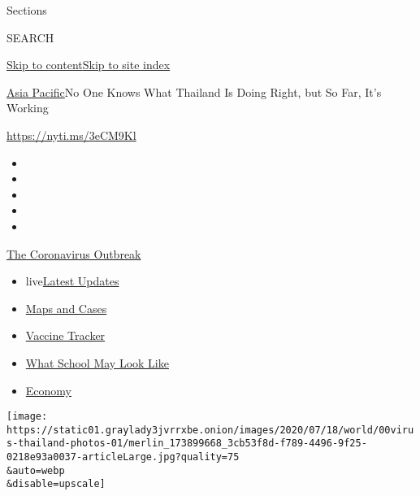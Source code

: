 Sections

SEARCH

\protect\hyperlink{site-content}{Skip to
content}\protect\hyperlink{site-index}{Skip to site index}

\href{/section/world/asia}{Asia Pacific}\textbar{}No One Knows What
Thailand Is Doing Right, but So Far, It's Working

\url{https://nyti.ms/3eCM9Kl}

\begin{itemize}
\item
\item
\item
\item
\item
\end{itemize}

\href{https://www.nytimes3xbfgragh.onion/news-event/coronavirus?action=click\&pgtype=Article\&state=default\&region=TOP_BANNER\&context=storylines_menu}{The
Coronavirus Outbreak}

\begin{itemize}
\tightlist
\item
  live\href{https://www.nytimes3xbfgragh.onion/2020/08/01/world/coronavirus-covid-19.html?action=click\&pgtype=Article\&state=default\&region=TOP_BANNER\&context=storylines_menu}{Latest
  Updates}
\item
  \href{https://www.nytimes3xbfgragh.onion/interactive/2020/us/coronavirus-us-cases.html?action=click\&pgtype=Article\&state=default\&region=TOP_BANNER\&context=storylines_menu}{Maps
  and Cases}
\item
  \href{https://www.nytimes3xbfgragh.onion/interactive/2020/science/coronavirus-vaccine-tracker.html?action=click\&pgtype=Article\&state=default\&region=TOP_BANNER\&context=storylines_menu}{Vaccine
  Tracker}
\item
  \href{https://www.nytimes3xbfgragh.onion/interactive/2020/07/29/us/schools-reopening-coronavirus.html?action=click\&pgtype=Article\&state=default\&region=TOP_BANNER\&context=storylines_menu}{What
  School May Look Like}
\item
  \href{https://www.nytimes3xbfgragh.onion/live/2020/07/31/business/stock-market-today-coronavirus?action=click\&pgtype=Article\&state=default\&region=TOP_BANNER\&context=storylines_menu}{Economy}
\end{itemize}

\texttt{[image: https://static01.graylady3jvrrxbe.onion/images/2020/07/18/world/00virus-thailand-photos-01/merlin\_173899668\_3cb53f8d-f789-4496-9f25-0218e93a0037-articleLarge.jpg?quality=75\\\&auto=webp\\\&disable=upscale]}

